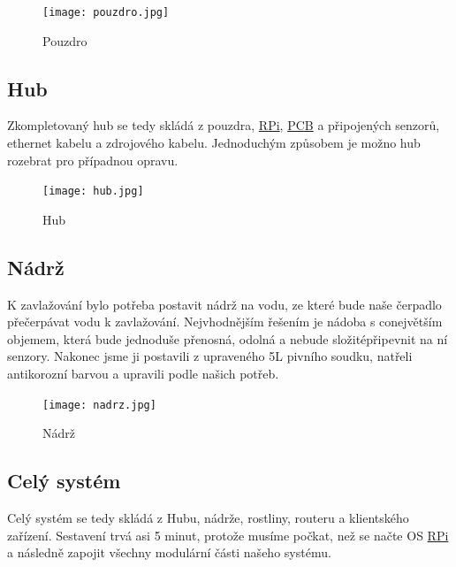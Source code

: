 \documentclass[czech,12pt,a4paper]{article}
\begin{document}
\vspace*{1cm}
\begin{figure}[h]
	\centering
	\texttt{[image: pouzdro.jpg]}
	\caption{Pouzdro}
	\label{fig:pouzdro}
\end{figure}

\subsection{Hub}

Zkompletovaný hub se tedy skládá z pouzdra, \underline{\ac{RPi}}, \underline{\ac{PCB}} a připojených senzorů, ethernet kabelu a zdrojového kabelu. Jednoduchým způsobem je možno hub rozebrat pro případnou opravu.

\vspace*{1cm}
\begin{figure}[h]
	\centering
	\texttt{[image: hub.jpg]}
	\caption{Hub}
\end{figure}

\clearpage

\subsection{Nádrž}

K zavlažování bylo potřeba postavit nádrž na vodu, ze které bude naše čerpadlo přečerpávat vodu k zavlažování. Nejvhodnějším řešením je nádoba s co\linebreak největším objemem, která bude jednoduše přenosná, odolná a nebude složité\linebreak připevnit na ní senzory. Nakonec jsme ji postavili z upraveného 5L pivního soudku, natřeli antikorozní barvou a upravili podle našich potřeb.

\vspace*{1cm}
\begin{figure}[h]
	\centering
	\texttt{[image: nadrz.jpg]}
	\caption{Nádrž}
\end{figure}

\clearpage

\subsection{Celý systém}

Celý systém se tedy skládá z Hubu, nádrže, rostliny, routeru a klientského zařízení. Sestavení trvá asi 5 minut, protože musíme počkat, než se načte OS \underline{\ac{RPi}} a následně zapojit všechny modulární části našeho systému.
\end{document}
